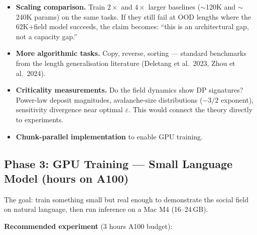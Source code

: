 \documentclass[11pt,a4paper]{article}
\begin{document}
\begin{itemize}
    \item \textbf{Scaling comparison.}  Train $2\times$ and
          $4\times$ larger baselines ($\sim$120K and $\sim$240K
          params) on the same tasks.  If they still fail at OOD
          lengths where the 62K+field model succeeds, the claim
          becomes: ``this is an architectural gap, not a capacity
          gap.''

    \item \textbf{More algorithmic tasks.}  Copy, reverse, sorting
          --- standard benchmarks from the length generalisation
          literature (Deletang et al.\ 2023, Zhou et al.\ 2024).

    \item \textbf{Criticality measurements.}  Do the field dynamics
          show DP signatures?  Power-law deposit magnitudes,
          avalanche-size distributions ($-3/2$ exponent),
          sensitivity divergence near optimal $\varepsilon$.
          This would connect the theory directly to experiments.

    \item \textbf{Chunk-parallel implementation} to enable GPU
          training.
\end{itemize}

\subsection{Phase 3: GPU Training --- Small Language Model (hours on A100)}

The goal: train something small but real enough to demonstrate the
social field on natural language, then run inference on a Mac M4
(16--24\,GB).

\textbf{Recommended experiment} (3 hours A100 budget):
\end{document}
